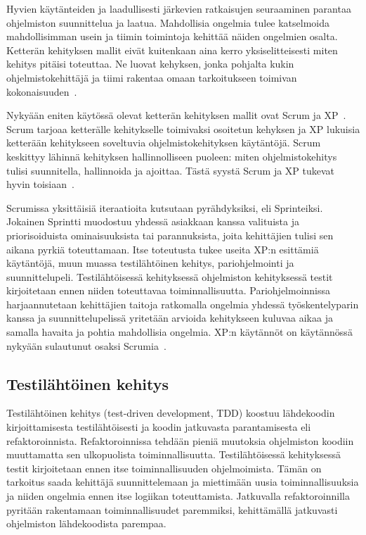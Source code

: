\documentclass[finnish]{../tktltiki2}
\theoremstyle{definition}
\theoremstyle{remark}
\begin{document}
    Hyvien käytänteiden ja laadullisesti järkevien ratkaisujen seuraaminen parantaa ohjelmiston suunnittelua ja laatua. 
Mahdollisia ongelmia tulee katselmoida mahdollisimman usein ja tiimin toimintoja kehittää näiden ongelmien osalta. 
Ketterän kehityksen mallit eivät kuitenkaan aina kerro yksiselitteisesti miten kehitys pitäisi toteuttaa. Ne luovat 
kehyksen, jonka pohjalta kukin ohjelmistokehittäjä ja tiimi rakentaa omaan tarkoitukseen toimivan 
kokonaisuuden~\cite{Kn07}.

    Nykyään eniten käytössä olevat ketterän kehityksen mallit ovat Scrum ja XP~\cite{SS10}. Scrum tarjoaa ketterälle 
kehitykselle toimivaksi osoitetun kehyksen ja XP lukuisia ketterään kehitykseen soveltuvia ohjelmistokehityksen 
käytäntöjä. Scrum keskittyy lähinnä kehityksen hallinnolliseen puoleen: miten ohjelmistokehitys tulisi suunnitella, 
hallinnoida ja ajoittaa. Tästä syystä Scrum ja XP tukevat hyvin toisiaan~\cite{Kn07}.

    Scrumissa yksittäisiä iteraatioita kutsutaan pyrähdyksiksi, eli Sprinteiksi. Jokainen Sprintti muodostuu yhdessä 
asiakkaan kanssa valituista ja priorisoiduista ominaisuuksista tai parannuksista, joita kehittäjien tulisi sen aikana 
pyrkiä toteuttamaan. Itse toteutusta tukee useita XP:n esittämiä käytäntöjä, muun muassa testilähtöinen kehitys, 
pariohjelmointi ja suunnittelupeli. Testilähtöisessä kehityksessä ohjelmiston kehityksessä testit kirjoitetaan ennen 
niiden toteuttavaa toiminnallisuutta. Pariohjelmoinnissa harjaannutetaan kehittäjien taitoja ratkomalla ongelmia yhdessä 
työskentelyparin kanssa ja suunnittelupelissä yritetään arvioida kehitykseen kuluvaa aikaa ja samalla havaita ja pohtia 
mahdollisia ongelmia. XP:n käytännöt on käytännössä nykyään sulautunut osaksi Scrumia~\cite{Kn07}.

\subsection{Testilähtöinen kehitys}

Testilähtöinen kehitys (test-driven development, TDD) koostuu lähdekoodin kirjoittamisesta testilähtöisesti ja koodin 
jatkuvasta parantamisesta eli refaktoroinnista. Refaktoroinnissa tehdään pieniä muutoksia ohjelmiston koodiin 
muuttamatta sen ulkopuolista toiminnallisuutta. Testilähtöisessä kehityksessä testit kirjoitetaan ennen itse 
toiminnallisuuden ohjelmoimista. Tämän on tarkoitus saada kehittäjä suunnittelemaan ja miettimään uusia 
toiminnallisuuksia ja niiden ongelmia ennen itse logiikan toteuttamista. Jatkuvalla refaktoroinnilla pyritään 
rakentamaan toiminnallisuudet paremmiksi, kehittämällä jatkuvasti ohjelmiston lähdekoodista parempaa.
\end{document}
